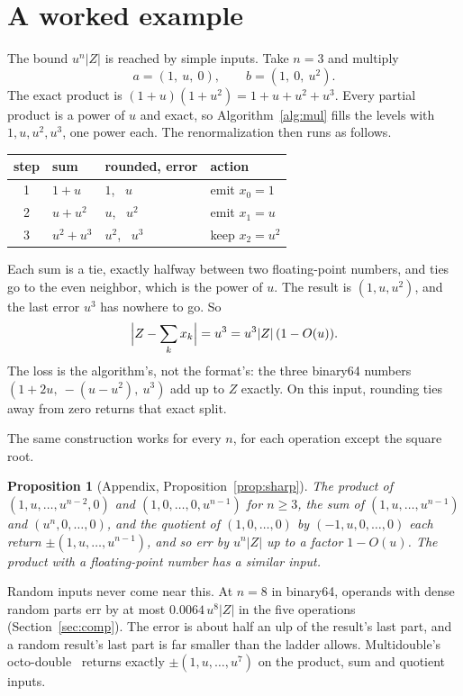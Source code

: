 \documentclass[conference]{IEEEtran}
\newtheorem{proposition}[theorem]{Proposition}
\theoremstyle{definition}
\theoremstyle{remark}
\begin{document}
\section{A worked example}\label{sec:example}

The bound $u^n|Z|$ is reached by simple inputs. Take $n = 3$ and multiply
\[
a = (1,\ u,\ 0), \qquad b = (1,\ 0,\ u^2).
\]
The exact product is $(1 + u)(1 + u^2) = 1 + u + u^2 + u^3$. Every partial product is a power of $u$ and exact, so
Algorithm~\ref{alg:mul} fills the levels with $1, u, u^2, u^3$, one power each. The renormalization then runs as
follows.
\begin{center}
\begin{tabular}{clll}
\toprule
step & sum & rounded, error & action \\
\midrule
1 & $1 + u$ & $1$, \ $u$ & emit $x_0 = 1$ \\
2 & $u + u^2$ & $u$, \ $u^2$ & emit $x_1 = u$ \\
3 & $u^2 + u^3$ & $u^2$, \ $u^3$ & keep $x_2 = u^2$ \\
\bottomrule
\end{tabular}
\end{center}
Each sum is a tie, exactly halfway between two floating-point numbers, and ties go to the even neighbor, which is the
power of $u$. The result is $(1, u, u^2)$, and the last error $u^3$ has nowhere to go. So
\[
\Bigl|Z - \sum_k x_k\Bigr| = u^3 = u^3|Z|\,(1 - O(u)).
\]
The loss is the algorithm's, not the format's: the three binary64 numbers $(1 + 2u,\ -(u - u^2),\ u^3)$ add up to $Z$
exactly. On this input, rounding ties away from zero returns that exact split.

The same construction works for every $n$, for each operation except the square root.

\begin{proposition}[Appendix, Proposition~\ref{prop:sharp}]\label{prop:worst}
The product of $(1, u, \dots, u^{n-2}, 0)$ and $(1, 0, \dots, 0, u^{n-1})$ for $n \ge 3$, the sum of $(1, u, \dots,
u^{n-1})$ and $(u^n, 0, \dots, 0)$, and the quotient of $(1, 0, \dots, 0)$ by $(-1, u, 0, \dots, 0)$ each return $\pm(1,
u, \dots, u^{n-1})$, and so err by $u^n|Z|$ up to a factor $1 - O(u)$. The product with a floating-point number has a
similar input.
\end{proposition}

Random inputs never come near this. At $n = 8$ in binary64, operands with dense random parts err by at most
$0.0064\,u^8|Z|$ in the five operations (Section~\ref{sec:comp}). The error is about half an ulp of the result's last part, and a random result's last
part is far smaller than the ladder allows. Multidouble's octo-double~\cite{md} returns exactly $\pm(1, u, \dots, u^7)$
on the product, sum and quotient inputs.
\end{document}
